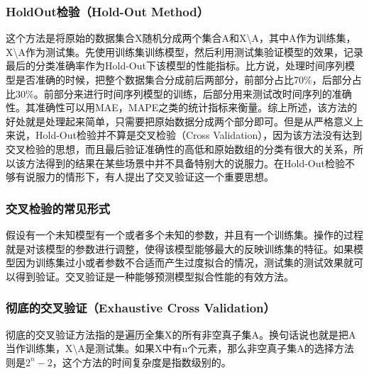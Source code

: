 \documentclass[10pt,a4paper]{ctexbook}
\begin{document}
\subsubsection{HoldOut检验（Hold-Out Method）}
这个方法是将原始的数据集合X随机分成两个集合A和X\textbackslash{A}，其中A作为训练集，X\textbackslash{A}作为测试集。先使用训练集训练模型，然后利用测试集验证模型的效果，记录最后的分类准确率作为Hold-Out下该模型的性能指标。比方说，处理时间序列模型是否准确的时候，把整个数据集合分成前后两部分，前部分占比70\%，后部分占比30\%。前部分来进行时间序列模型的训练，后部分用来测试改时间序列的准确性。其准确性可以用MAE，MAPE之类的统计指标来衡量。综上所述，该方法的好处就是处理起来简单，只需要把原始数据分成两个部分即可。但是从严格意义上来说，Hold-Out检验并不算是交叉检验（Cross Validation），因为该方法没有达到交叉检验的思想，而且最后验证准确性的高低和原始数组的分类有很大的关系，所以该方法得到的结果在某些场景中并不具备特别大的说服力。在Hold-Out检验不够有说服力的情形下，有人提出了交叉验证这一个重要思想。

\subsubsection{交叉检验的常见形式}
假设有一个未知模型有一个或者多个未知的参数，并且有一个训练集。操作的过程就是对该模型的参数进行调整，使得该模型能够最大的反映训练集的特征。如果模型因为训练集过小或者参数不合适而产生过度拟合的情况，测试集的测试效果就可以得到验证。交叉验证是一种能够预测模型拟合性能的有效方法。

\subsubsection{彻底的交叉验证（Exhaustive Cross Validation）}
彻底的交叉验证方法指的是遍历全集X的所有非空真子集A。换句话说也就是把A当作训练集，X\textbackslash{A}是测试集。如果X中有n个元素，那么非空真子集A的选择方法则是$2^{n}-2$，这个方法的时间复杂度是指数级别的。
\end{document}
